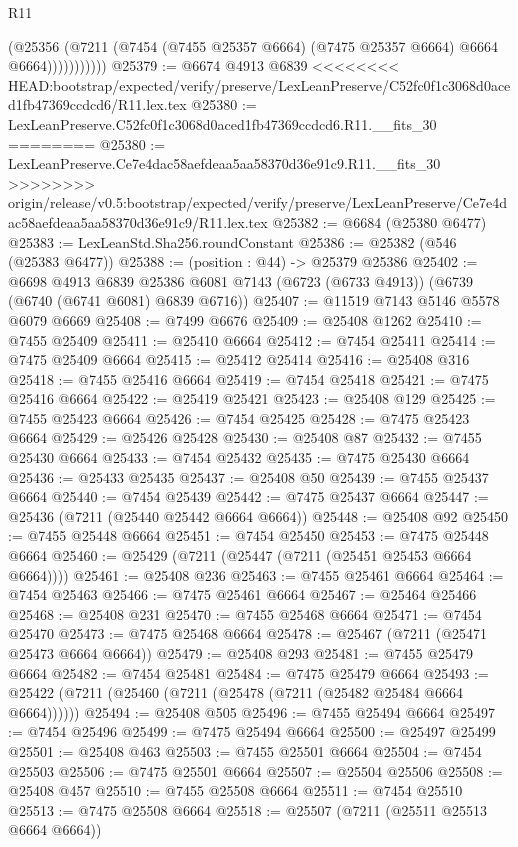 \begin{lexlean}{R11}
\begin{coremodule}
{{{{{{{{{{{{{{{{{{{{{{{{{{{{{{{{{{{{{{{{{{{{{{{{{{{{{{{{{{{{{{{{{{{{{{{{{{{{{{{{{{                    (@25356
                      (@7211 (@7454 (@7455 @25357 @6664) (@7475 @25357 @6664) @6664 @6664)))))))))))
@25379 := @6674 @4913 @6839
<<<<<<<< HEAD:bootstrap/expected/verify/preserve/LexLeanPreserve/C52fc0f1c3068d0aced1fb47369ccdcd6/R11.lex.tex
@25380 := LexLeanPreserve.C52fc0f1c3068d0aced1fb47369ccdcd6.R11.__fits_30
========
@25380 := LexLeanPreserve.Ce7e4dac58aefdeaa5aa58370d36e91c9.R11.__fits_30
>>>>>>>> origin/release/v0.5:bootstrap/expected/verify/preserve/LexLeanPreserve/Ce7e4dac58aefdeaa5aa58370d36e91c9/R11.lex.tex
@25382 := @6684 (@25380 @6477)
@25383 := LexLeanStd.Sha256.roundConstant
@25386 := @25382 (@546 (@25383 @6477))
@25388 := (position : @44) -> @25379 @25386
@25402 := @6698
    @4913
    @6839
    @25386
    @6081
    @7143
    (@6723 (@6733 @4913))
    (@6739 (@6740 (@6741 @6081) @6839 @6716))
@25407 := @11519 @7143 @5146 @5578 @6079 @6669
@25408 := @7499 @6676
@25409 := @25408 @1262
@25410 := @7455 @25409
@25411 := @25410 @6664
@25412 := @7454 @25411
@25414 := @7475 @25409 @6664
@25415 := @25412 @25414
@25416 := @25408 @316
@25418 := @7455 @25416 @6664
@25419 := @7454 @25418
@25421 := @7475 @25416 @6664
@25422 := @25419 @25421
@25423 := @25408 @129
@25425 := @7455 @25423 @6664
@25426 := @7454 @25425
@25428 := @7475 @25423 @6664
@25429 := @25426 @25428
@25430 := @25408 @87
@25432 := @7455 @25430 @6664
@25433 := @7454 @25432
@25435 := @7475 @25430 @6664
@25436 := @25433 @25435
@25437 := @25408 @50
@25439 := @7455 @25437 @6664
@25440 := @7454 @25439
@25442 := @7475 @25437 @6664
@25447 := @25436 (@7211 (@25440 @25442 @6664 @6664))
@25448 := @25408 @92
@25450 := @7455 @25448 @6664
@25451 := @7454 @25450
@25453 := @7475 @25448 @6664
@25460 := @25429 (@7211 (@25447 (@7211 (@25451 @25453 @6664 @6664))))
@25461 := @25408 @236
@25463 := @7455 @25461 @6664
@25464 := @7454 @25463
@25466 := @7475 @25461 @6664
@25467 := @25464 @25466
@25468 := @25408 @231
@25470 := @7455 @25468 @6664
@25471 := @7454 @25470
@25473 := @7475 @25468 @6664
@25478 := @25467 (@7211 (@25471 @25473 @6664 @6664))
@25479 := @25408 @293
@25481 := @7455 @25479 @6664
@25482 := @7454 @25481
@25484 := @7475 @25479 @6664
@25493 := @25422 (@7211 (@25460 (@7211 (@25478 (@7211 (@25482 @25484 @6664 @6664))))))
@25494 := @25408 @505
@25496 := @7455 @25494 @6664
@25497 := @7454 @25496
@25499 := @7475 @25494 @6664
@25500 := @25497 @25499
@25501 := @25408 @463
@25503 := @7455 @25501 @6664
@25504 := @7454 @25503
@25506 := @7475 @25501 @6664
@25507 := @25504 @25506
@25508 := @25408 @457
@25510 := @7455 @25508 @6664
@25511 := @7454 @25510
@25513 := @7475 @25508 @6664
@25518 := @25507 (@7211 (@25511 @25513 @6664 @6664))
}}}}}}}}}}}}}}}}}}}}}}}}}}}}}}}}}}}}}}}}}}}}}}}}}}}}}}}}}}}}}}}}}}}}}}}}}}}}}}}}}}
\end{coremodule}
\end{lexlean}
